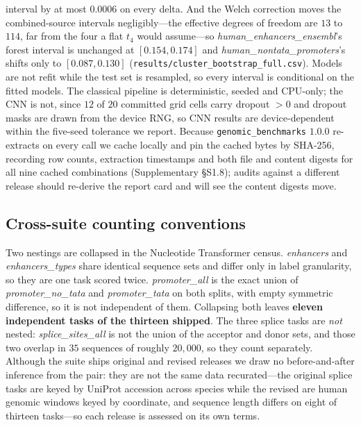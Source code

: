 \documentclass[11pt,a4paper]{article}
\begin{document}
interval by at most $0.0006$ on every delta. And the Welch correction moves the combined-source intervals negligibly---the effective degrees of freedom are $13$ to $114$, far from the four a flat $t_4$ would assume---so \textit{human\_enhancers\_ensembl}'s forest interval is unchanged at $[0.154,0.174]$ and \textit{human\_nontata\_promoters}'s shifts only to $[0.087,0.130]$ (\texttt{results/cluster\_bootstrap\_full.csv}). Models are not refit while the test set is resampled, so every interval is conditional on the fitted models. The classical pipeline is deterministic, seeded and CPU-only; the CNN is not, since $12$ of $20$ committed grid cells carry dropout $>0$ and dropout masks are drawn from the device RNG, so CNN results are device-dependent within the five-seed tolerance we report. Because \texttt{genomic\_benchmarks} $1.0.0$ re-extracts on every call we cache locally and pin the cached bytes by SHA-256, recording row counts, extraction timestamps and both file and content digests for all nine cached combinations (Supplementary \S S1.8); audits against a different release should re-derive the report card and will see the content digests move.

\subsection{Cross-suite counting conventions}\label{sec:s-count}
Two nestings are collapsed in the Nucleotide Transformer census. \textit{enhancers} and
\textit{enhancers\_types} share identical sequence sets and differ only in label granularity, so
they are one task scored twice. \textit{promoter\_all} is the exact union of
\textit{promoter\_no\_tata} and \textit{promoter\_tata} on both splits, with empty symmetric
difference, so it is not independent of them. Collapsing both leaves \textbf{eleven independent
tasks of the thirteen shipped}. The three splice tasks are \emph{not} nested:
\textit{splice\_sites\_all} is not the union of the acceptor and donor sets, and those two overlap
in $35$ sequences of roughly $20{,}000$, so they count separately. Although the suite ships original
and revised releases we draw no before-and-after inference from the pair: they are not the same data
recurated---the original splice tasks are keyed by UniProt accession across species while the
revised are human genomic windows keyed by coordinate, and sequence length differs on eight of
thirteen tasks---so each release is assessed on its own terms.
\end{document}
